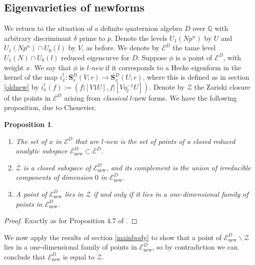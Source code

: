 \documentclass[a4paper, notitlepage]{amsart}
\newcommand{\Q}{\ensuremath{\mathbb{Q}}\xspace}
\newtheorem{proposition}[theorem]{Proposition}
\newcommand{\OCS}{\ensuremath{\mathbf{S}^D_{x}(U;r)}\xspace}
\newcommand{\OCVS}{\ensuremath{\mathbf{S}^D_{x}(V;r)}\xspace}
\newcommand{\UU}{\ensuremath{U_1(Np^\alpha)}\xspace}
\newcommand{\VV}{\ensuremath{U_1(Np^\alpha)\cap U_0(l)}\xspace}
\begin{document}
\subsection{Eigenvarieties of newforms}\label{neweigen}
We return to the situation of a definite quaternion algebra $D$ over $\Q$ with arbitrary discriminant $\delta$ prime to $p$. Denote the levels $\UU$ by $U$ and $\VV$ by $V$, as before. We denote by $\mathscr{E}^D$ the tame level $U_1(N)\cap U_0(l)$ reduced eigencurve for $D$. Suppose $\phi$ is a point of $\mathscr{E}^D$, with weight $x$. We say that $\phi$ is \emph{$l$-new} if it corresponds to a Hecke eigenform in the kernel of the map $i^\dagger_x: \OCVS \rightarrow \OCS$, where this is defined as in section \ref{oldnew} by $i^\dagger_x (f):=(f|[V 1 U],f|[V \eta_l^{-1} U])$. Denote by $\mathscr{Z}$ the Zariski closure of the points in $\mathscr{E}^D$ arising from \emph{classical} $l$-new forms. We have the following proposition, due to Chenevier.

\begin{proposition}
\begin{enumerate}\item The set of $x$ in $\mathscr{E}^D$ that are $l$-new is the set of points of a closed reduced analytic subspace $\mathscr{E}^D_{\mathrm{new}} \subset \mathscr{E}^D$. 
\item $\mathscr{Z}$ is a closed subspace of $\mathscr{E}^D_{\mathrm{new}}$, and its complement is the union of irreducible components of dimension $0$ in $\mathscr{E}^D_{\mathrm{new}}$. 
\item A point of $\mathscr{E}^D_{\mathrm{new}}$ lies in $\mathscr{Z}$ if and only if it lies in a one-dimensional family of points in $\mathscr{E}^D_{\mathrm{new}}$.\end{enumerate}\end{proposition}
\begin{proof}
Exactly as for Proposition 4.7 of \cite{MR2111512}.
\end{proof}

We now apply the results of section \ref{mainbody} to show that a point of $\mathscr{E}^D_{\mathrm{new}}\backslash \mathscr{Z}$ lies in a one-dimensional family of points in $\mathscr{E}^D_{\mathrm{new}}$, so by contradiction we can conclude that $\mathscr{E}^D_{\mathrm{new}}$ is equal to $\mathscr{Z}$.
\end{document}
